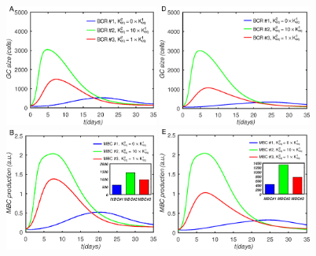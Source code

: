 \renewcommand{\thefigure}{S\arabic{figure}}
\renewcommand{\thetable}{S\arabic{table}}
\renewcommand{\theequation}{S\arabic{equation}}
\renewcommand{\thesection}{}
\renewcommand{\thesubsection}{S\arabic{subsection}}
\setcounter{figure}{0}
\setcounter{table}{0}
\setcounter{section}{0}
\setcounter{equation}{0}

%
\label{sec:sm}
\renewcommand{\thepage}{S\arabic{page}}
\setcounter{page}{1}
\begin{figure}[!h]
\centering
\includegraphics[width=0.45\textwidth]{../figS1abc/gcsize.eps}
\includegraphics[width=0.45\textwidth]{../figS1def/gcsize.eps}
\includegraphics[width=0.45\textwidth]{../figS1abc/dmbc.eps}
\includegraphics[width=0.45\textwidth]{../figS1def/dmbc.eps}

\end{figure}
